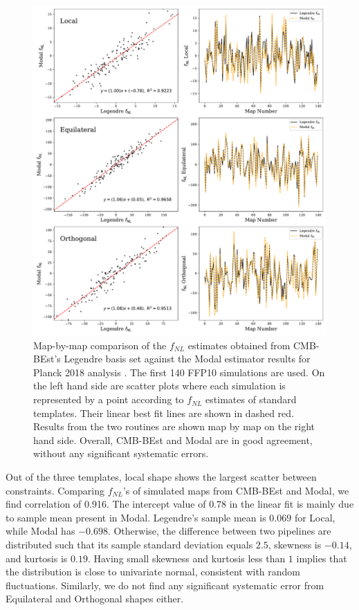 \begin{figure}[htbp!] 
	\centering    
	\includegraphics[width=\textwidth]{map_by_map_Legendre_Modal.pdf}
	\caption{Map-by-map comparison of the $f_{NL}$ estimates obtained from CMB-BEst's Legendre basis set against the Modal estimator results for Planck 2018 analysis \cite{PlanckCollaboration2018}. The first 140 FFP10 simulations are used. On the left hand side are scatter plots where each simulation is represented by a point according to $f_{NL}$ estimates of standard templates. Their linear best fit lines are shown in dashed red. Results from the two routines are shown map by map on the right hand side. Overall, CMB-BEst and Modal are in good agreement, without any significant systematic errors.}
	\label{fig:map_by_map_Legendre_Modal}
\end{figure}

Out of the three templates, local shape shows the largest scatter between constraints. Comparing $f_{NL}$'s of simulated maps from CMB-BEst and Modal, we find correlation of 0.916. The intercept value of $0.78$ in the linear fit is mainly due to sample mean present in Modal. Legendre's sample mean is $0.069$ for Local, while Modal has $-0.698$. Otherwise, the difference between two pipelines are distributed such that its sample standard deviation equals $2.5$, skewness is $-0.14$, and kurtosis is $0.19$. Having small skewness and kurtosis less than $1$ implies that the distribution is close to univariate normal, consistent with random fluctuations. Similarly, we do not find any significant systematic error from Equilateral and Orthogonal shapes either.

